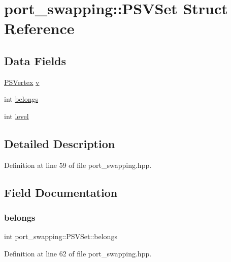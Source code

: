 \hypertarget{structport__swapping_1_1PSVSet}{}\section{port\+\_\+swapping\+:\+:P\+S\+V\+Set Struct Reference}
\label{structport__swapping_1_1PSVSet}
\subsection*{Data Fields}
\begin{DoxyCompactItemize}
\item 
\hyperlink{classport__swapping_a9588366dd46f9f32aab2c8de93d5679f}{P\+S\+Vertex} \hyperlink{structport__swapping_1_1PSVSet_a4191401e9e071f32ddf8c58d7b154c77}{v}
\item 
int \hyperlink{structport__swapping_1_1PSVSet_a85817c5765f6eb0c42f1106bc2928f97}{belongs}
\item 
int \hyperlink{structport__swapping_1_1PSVSet_aa51b0c8c4061d1669558f4411470a3ed}{level}
\end{DoxyCompactItemize}


\subsection{Detailed Description}


Definition at line 59 of file port\+\_\+swapping.\+hpp.



\subsection{Field Documentation}
\mbox{\label{structport__swapping_1_1PSVSet_a85817c5765f6eb0c42f1106bc2928f97}} 
\subsubsection{\texorpdfstring{belongs}{belongs}}
{\footnotesize\ttfamily int port\+\_\+swapping\+::\+P\+S\+V\+Set\+::belongs}



Definition at line 62 of file port\+\_\+swapping.\+hpp.



